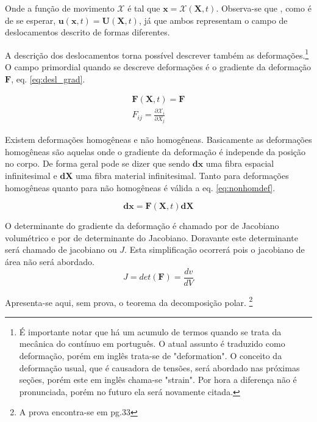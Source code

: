Onde a função de movimento $ \mathcal{X} $ é tal que $ \boldsymbol{x} = \mathcal{X}(\boldsymbol{X},t) $. Observa-se que , como é de se esperar, $ \boldsymbol{u}(\boldsymbol{x},t) =  \boldsymbol{U}(\boldsymbol{X},t)  $, já que ambos representam o campo de deslocamentos descrito de formas diferentes. \par

A descrição dos deslocamentos torna possível descrever também as deformações.\footnote{É importante notar que há um acumulo de termos quando se trata da mecânica do contínuo em português. O atual assunto é traduzido como deformação, porém em inglês trata-se de "deformation". O conceito da deformação usual, que é causadora de tensões, será abordado nas próximas seções, porém este em inglês chama-se "strain". Por hora a diferença não é pronunciada, porém no futuro ela será novamente citada.} O campo primordial quando se descreve deformações é o gradiente da deformação $ \boldsymbol{F} $, eq. \ref{eq:desl_grad}.

\begin{align}\label{eq:desl_grad}
    \boldsymbol{F}(\boldsymbol{X},t) = \boldsymbol{F} \\
    F_{ij} = \frac{\partial \mathcal{X}_i}{\partial X_j}
\end{align}

Existem deformações homogêneas e não homogêneas. Basicamente as deformações homogêneas são aquelas onde o gradiente da deformação é independe da posição no corpo. De forma geral pode se dizer que sendo $ \boldsymbol{dx} $ uma fibra espacial infinitesimal e $ \boldsymbol{dX} $ uma fibra material infinitesimal. Tanto para deformações homogêneas quanto para não homogêneas é válida a eq. \ref{eq:nonhomdef}.

\begin{equation}
    \boldsymbol{dx} = \boldsymbol{F}(\boldsymbol{X},t) \boldsymbol{dX}
    \label{eq:nonhomdef}
\end{equation}

O determinante do gradiente da deformação é chamado por \cite{gurtin_fried_anand_2013} de Jacobiano volumétrico e por \cite{hiermaier_2008} de determinante do Jacobiano. Doravante este determinante será chamado de jacobiano ou $ J $. Esta simplificação ocorrerá pois o jacobiano de área não será abordado.
\begin{equation}
    J = det(\boldsymbol{F}) = \frac{dv}{dV}
\end{equation}

Apresenta-se aqui, sem prova, o teorema da decomposição polar. \footnote{A prova encontra-se em \cite{gurtin_fried_anand_2013} pg.33}

